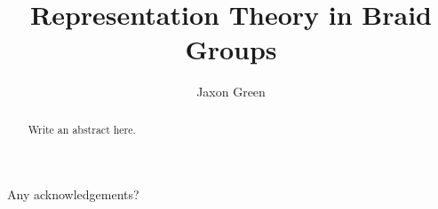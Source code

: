 \documentclass[10pt]{ucthesis}
\begin{document}
\hypersetup{nolinks=true}



\title{Representation Theory in Braid Groups}
\author{Jaxon Green}



\maketitle

\begin{frontmatter}

\copyrightpage


\begin{abstract}

Write an abstract here.

\vspace*{-10pt}
\end{abstract}

\begin{acknowledgements}

Any acknowledgements?

\end{acknowledgements}

\tableofcontents


\listoftables

\listoffigures



\end{frontmatter}

\pagestyle{plain}




\renewcommand{\baselinestretch}{1.66}


\end{document}
